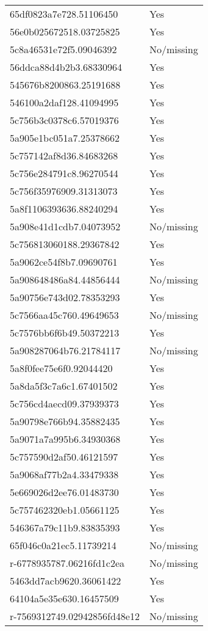 \begin{tabular}{ll}
65df0823a7e728.51106450 & Yes \\
56e0b025672518.03725825 & Yes \\
5c8a46531e72f5.09046392 & No/missing \\
56ddca88d4b2b3.68330964 & Yes \\
545676b8200863.25191688 & Yes \\
546100a2daf128.41094995 & Yes \\
5c756b3c0378c6.57019376 & Yes \\
5a905e1bc051a7.25378662 & Yes \\
5c757142af8d36.84683268 & Yes \\
5c756e284791c8.96270544 & Yes \\
5c756f35976909.31313073 & Yes \\
5a8f1106393636.88240294 & Yes \\
5a908e41d1cdb7.04073952 & No/missing \\
5c756813060188.29367842 & Yes \\
5a9062ce54f8b7.09690761 & Yes \\
5a908648486a84.44856444 & No/missing \\
5a90756e743d02.78353293 & Yes \\
5c7566aa45c760.49649653 & No/missing \\
5c7576bb6f6b49.50372213 & Yes \\
5a908287064b76.21784117 & No/missing \\
5a8f0fee75e6f0.92044420 & Yes \\
5a8da5f3c7a6c1.67401502 & Yes \\
5c756cd4aecd09.37939373 & Yes \\
5a90798e766b94.35882435 & Yes \\
5a9071a7a995b6.34930368 & Yes \\
5c757590d2af50.46121597 & Yes \\
5a9068af77b2a4.33479338 & Yes \\
5e669026d2ee76.01483730 & Yes \\
5c757462320eb1.05661125 & Yes \\
546367a79c11b9.83835393 & Yes \\
65f046c0a21ec5.11739214 & No/missing \\
r-6778935787.06216fd1c2ea & No/missing \\
5463dd7acb9620.36061422 & Yes \\
64104a5e35e630.16457509 & Yes \\
r-7569312749.02942856fd48e12 & No/missing \\

\end{tabular}

